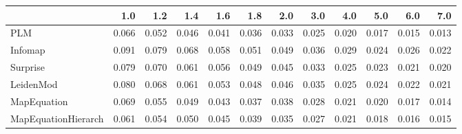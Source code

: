 \begin{tabular}{lrrrrrrrrrrr}
\toprule
{} &   1.0 &   1.2 &   1.4 &   1.6 &   1.8 &   2.0 &   3.0 &   4.0 &   5.0 &   6.0 &   7.0 \\
\midrule
PLM                 & 0.066 & 0.052 & 0.046 & 0.041 & 0.036 & 0.033 & 0.025 & 0.020 & 0.017 & 0.015 & 0.013 \\
Infomap             & 0.091 & 0.079 & 0.068 & 0.058 & 0.051 & 0.049 & 0.036 & 0.029 & 0.024 & 0.026 & 0.022 \\
Surprise            & 0.079 & 0.070 & 0.061 & 0.056 & 0.049 & 0.045 & 0.033 & 0.025 & 0.023 & 0.021 & 0.020 \\
LeidenMod           & 0.080 & 0.068 & 0.061 & 0.053 & 0.048 & 0.046 & 0.035 & 0.025 & 0.024 & 0.022 & 0.021 \\
MapEquation         & 0.069 & 0.055 & 0.049 & 0.043 & 0.037 & 0.038 & 0.028 & 0.021 & 0.020 & 0.017 & 0.014 \\
MapEquationHierarch & 0.061 & 0.054 & 0.050 & 0.045 & 0.039 & 0.035 & 0.027 & 0.021 & 0.018 & 0.016 & 0.015 \\
\bottomrule
\end{tabular}
